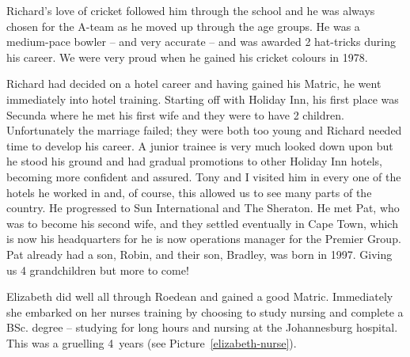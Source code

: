 
Richard's love of cricket followed him through the school and he was
always chosen for the A-team as he moved up through the age groups. He
was a medium-pace bowler -- and very accurate -- and was awarded 2
hat-tricks during his career. We were very proud when he gained his
cricket colours in 1978.

Richard had decided on a hotel career and having gained his Matric, he
went immediately into hotel training. Starting off with Holiday Inn,
his first place was Secunda where he met his first wife and they were
to have 2 children. Unfortunately the marriage failed; they were both
too young and Richard needed time to develop his career. A junior
trainee is very much looked down upon but he stood his ground and had
gradual promotions to other Holiday Inn hotels, becoming more
confident and assured. Tony and I visited him in every one of the
hotels he worked in and, of course, this allowed us to see many parts
of the country. He progressed to Sun International and The
Sheraton. He met Pat, who was to become his second wife, and they
settled eventually in Cape Town, which is now his headquarters for he
is now operations manager for the Premier Group. Pat already had a
son, Robin, and their son, Bradley, was born in 1997. Giving us 4
grandchildren but more to come!

Elizabeth did well all through Roedean and gained a good
Matric. Immediately she embarked on her nurses training by choosing to
study nursing and complete a BSc. degree -- studying for long hours
and nursing at the Johannesburg hospital. This was a gruelling
4~years (see Picture~\ref{elizabeth-nurse}).

